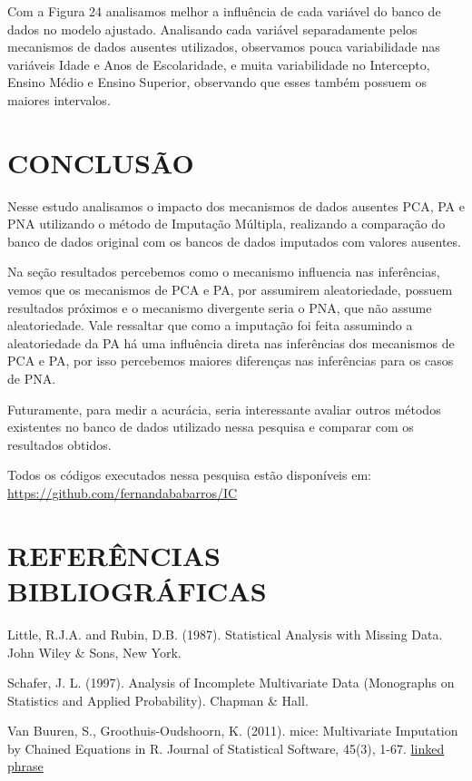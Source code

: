\documentclass[]{article}
\begin{document}
Com a Figura 24 analisamos melhor a influência de cada variável do banco
de dados no modelo ajustado. Analisando cada variável separadamente
pelos mecanismos de dados ausentes utilizados, observamos pouca
variabilidade nas variáveis Idade e Anos de Escolaridade, e muita
variabilidade no Intercepto, Ensino Médio e Ensino Superior, observando
que esses também possuem os maiores intervalos.

\section{CONCLUSÃO}\label{conclusao}

Nesse estudo analisamos o impacto dos mecanismos de dados ausentes PCA,
PA e PNA utilizando o método de Imputação Múltipla, realizando a
comparação do banco de dados original com os bancos de dados imputados
com valores ausentes.

Na seção resultados percebemos como o mecanismo influencia nas
inferências, vemos que os mecanismos de PCA e PA, por assumirem
aleatoriedade, possuem resultados próximos e o mecanismo divergente
seria o PNA, que não assume aleatoriedade. Vale ressaltar que como a
imputação foi feita assumindo a aleatoriedade da PA há uma influência
direta nas inferências dos mecanismos de PCA e PA, por isso percebemos
maiores diferenças nas inferências para os casos de PNA.

Futuramente, para medir a acurácia, seria interessante avaliar outros
métodos existentes no banco de dados utilizado nessa pesquisa e comparar
com os resultados obtidos.

Todos os códigos executados nessa pesquisa estão disponíveis em:
\url{https://github.com/fernandababarros/IC}

\section{REFERÊNCIAS BIBLIOGRÁFICAS}\label{referencias-bibliograficas}

Little, R.J.A. and Rubin, D.B. (1987). Statistical Analysis with Missing
Data. John Wiley \& Sons, New York.

Schafer, J. L. (1997). Analysis of Incomplete Multivariate Data
(Monographs on Statistics and Applied Probability). Chapman \& Hall.

Van Buuren, S., Groothuis-Oudshoorn, K. (2011). mice: Multivariate
Imputation by Chained Equations in R. Journal of Statistical Software,
45(3), 1-67. \href{http://www.jstatsoft.org/v45/i03/}{linked phrase}
\end{document}
